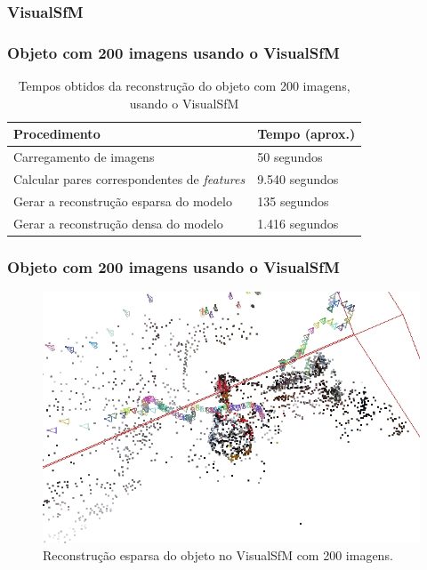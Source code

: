 \documentclass[table, usenames, svgnames, xcolor=dvipsnames]{beamer}
\begin{document}
\begin{frame}
	\begin{center}
	\end{center}
\end{frame}

\subsubsection{VisualSfM}

\begin{frame}
\frametitle{\textbf{Objeto com 200 imagens usando o VisualSfM}}
	\begin{table}[h!]
		\caption{Tempos obtidos da reconstrução do objeto com 200 imagens, usando o VisualSfM}
		\label{tab:temposSfM}
		\begin{tabular}{|l|p{3cm}|}
			\hline
			Procedimento & Tempo (aprox.) \\ \hline
			Carregamento de imagens & 50 segundos \\ \hline
			Calcular pares correspondentes de \emph{features} & 9.540 segundos \\ \hline
			Gerar a reconstrução esparsa do modelo & 135 segundos \\ \hline
			Gerar a reconstrução densa do modelo & 1.416 segundos \\ \hline
		\end{tabular}
	\end{table}
\end{frame}

\begin{frame}
\frametitle{\textbf{Objeto com 200 imagens usando o VisualSfM}}
	\begin{figure}[!h]
		\centering
		\includegraphics[width=0.8\linewidth]{figs/galinhasparsa.jpg}
		\caption{%
		Reconstrução esparsa do objeto no VisualSfM com 200 imagens.
		}\label{fig:reconstrucaoEsparsaVisualSFM}
	\end{figure}
\end{frame}
\end{document}
